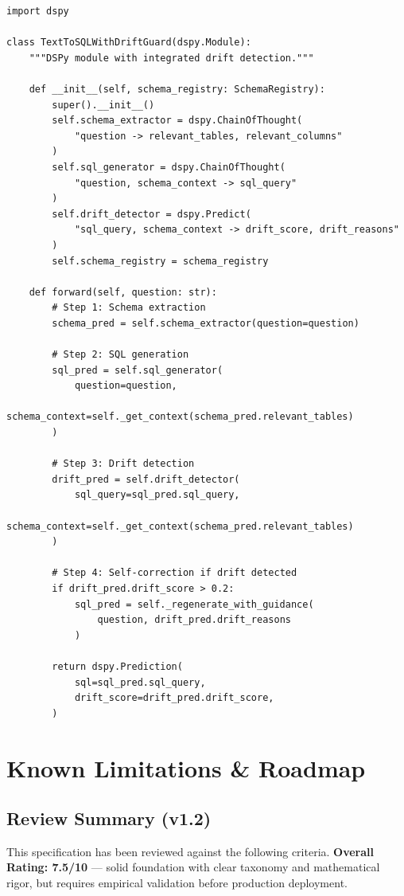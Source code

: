 \begin{lstlisting}[language=jsonx,caption={DSPy module with drift guard (future)}]
import dspy

class TextToSQLWithDriftGuard(dspy.Module):
    """DSPy module with integrated drift detection."""
    
    def __init__(self, schema_registry: SchemaRegistry):
        super().__init__()
        self.schema_extractor = dspy.ChainOfThought(
            "question -> relevant_tables, relevant_columns"
        )
        self.sql_generator = dspy.ChainOfThought(
            "question, schema_context -> sql_query"
        )
        self.drift_detector = dspy.Predict(
            "sql_query, schema_context -> drift_score, drift_reasons"
        )
        self.schema_registry = schema_registry
    
    def forward(self, question: str):
        # Step 1: Schema extraction
        schema_pred = self.schema_extractor(question=question)
        
        # Step 2: SQL generation
        sql_pred = self.sql_generator(
            question=question,
            schema_context=self._get_context(schema_pred.relevant_tables)
        )
        
        # Step 3: Drift detection
        drift_pred = self.drift_detector(
            sql_query=sql_pred.sql_query,
            schema_context=self._get_context(schema_pred.relevant_tables)
        )
        
        # Step 4: Self-correction if drift detected
        if drift_pred.drift_score > 0.2:
            sql_pred = self._regenerate_with_guidance(
                question, drift_pred.drift_reasons
            )
        
        return dspy.Prediction(
            sql=sql_pred.sql_query,
            drift_score=drift_pred.drift_score,
        )
\end{lstlisting}

\section{Known Limitations \& Roadmap}

\subsection{Review Summary (v1.2)}

This specification has been reviewed against the following criteria.
\textbf{Overall Rating: 7.5/10} --- solid foundation with clear taxonomy and
mathematical rigor, but requires empirical validation before production deployment.

